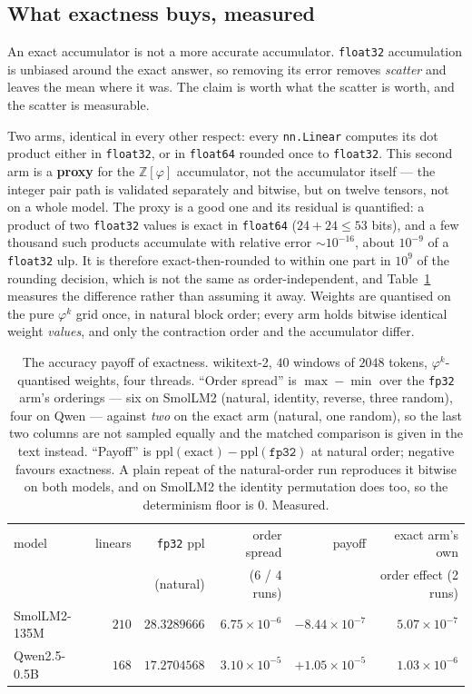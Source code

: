 \documentclass[11pt]{article}
\theoremstyle{definition}
\begin{document}
\subsection{What exactness buys, measured}
\label{sec:exactbuys}

An exact accumulator is not a more accurate accumulator. \texttt{float32}
accumulation is unbiased around the exact answer, so removing its error removes
\emph{scatter} and leaves the mean where it was. The claim is worth what the
scatter is worth, and the scatter is measurable.

Two arms, identical in every other respect: every \texttt{nn.Linear} computes its
dot product either in \texttt{float32}, or in \texttt{float64} rounded once to
\texttt{float32}. This second arm is a \textbf{proxy} for the
$\mathbb{Z}[\varphi]$ accumulator, not the accumulator itself --- the integer
pair path is validated separately and bitwise, but on twelve tensors, not on a
whole model. The proxy is a good one and its residual is quantified: a product of
two \texttt{float32} values is exact in \texttt{float64} ($24+24 \le 53$ bits),
and a few thousand such products accumulate with relative error $\sim10^{-16}$,
about $10^{-9}$ of a \texttt{float32} ulp. It is therefore exact-then-rounded to
within one part in $10^{9}$ of the rounding decision, which is not the same as
order-independent, and Table~\ref{tab:payoff} measures the difference rather than
assuming it away. Weights are quantised on the pure $\varphi^{k}$ grid once, in
natural block order; every arm holds bitwise identical weight \emph{values}, and
only the contraction order and the accumulator differ.

\begin{table}[t]\centering
\caption{The accuracy payoff of exactness. wikitext-2, $40$ windows of $2048$
tokens, $\varphi^{k}$-quantised weights, four threads. ``Order spread'' is
$\max-\min$ over the \texttt{fp32} arm's orderings --- six on SmolLM2 (natural,
identity, reverse, three random), four on Qwen --- against \emph{two} on the
exact arm (natural, one random), so the last two columns are not sampled equally
and the matched comparison is given in the text instead. ``Payoff'' is
$\mathrm{ppl}(\text{exact}) - \mathrm{ppl}(\texttt{fp32})$ at natural order;
negative favours exactness. A plain repeat of the natural-order run reproduces it
bitwise on both models, and on SmolLM2 the identity permutation does too, so the
determinism floor is $0$. Measured.}
\label{tab:payoff}
\begin{tabular}{lrrrrr}
\toprule
model & linears & \texttt{fp32} ppl & order spread & payoff & exact arm's own \\
      &         &   (natural)       & (6 / 4 runs) &        & order effect (2 runs) \\
\midrule
SmolLM2-135M   & $210$ & $28.3289666$ & $6.75\times10^{-6}$ & $-8.44\times10^{-7}$ & $5.07\times10^{-7}$ \\
Qwen2.5-0.5B   & $168$ & $17.2704568$ & $3.10\times10^{-5}$ & $+1.05\times10^{-5}$ & $1.03\times10^{-6}$ \\
\bottomrule
\end{tabular}
\end{table}
\end{document}
